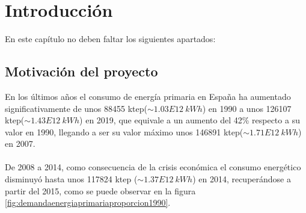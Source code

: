 \chapter{Introducción}

En este capítulo no deben faltar los siguientes apartados:

\section{Motivación del proyecto}

En los últimos años el consumo de energía primaria en España ha aumentado significativamente de unos 88455 ktep($\sim1.03E12 \ kWh$) en 1990 a unos 126107 ktep($\sim 1.43E12 \ kWh$) en 2019, que equivale a un aumento del 42\% respecto a su valor en 1990, llegando a ser su valor máximo unos 146891 ktep($\sim 1.71E12 \ kWh$) en 2007.\\\\
De 2008 a 2014, como consecuencia de la crisis económica el consumo energético disminuyó hasta unos 117824 ktep ($\sim 1.37E12 \ kWh$) en 2014, recuperándose a partir del 2015, como se puede observar en la figura \ref{fig:demandaenergiaprimariaproporcion1990}. \\


